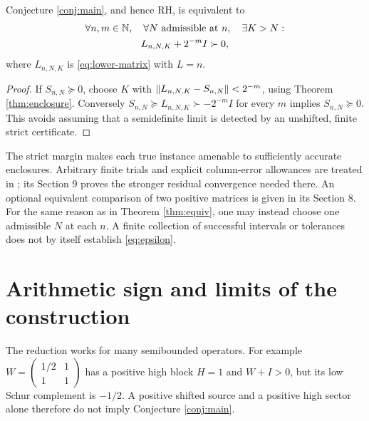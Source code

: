 \begin{corollary}\label{cor:epsilon}
Conjecture \ref{conj:main}, and hence RH, is equivalent to
\begin{equation}\label{eq:epsilon}
\begin{gathered}
\forall n,m\in\mathbb N,\quad\forall N\text{ admissible at }n,\quad\exists K>N:\\
L_{n,N,K}+2^{-m}I\succ0,
\end{gathered}
\end{equation}
where $L_{n,N,K}$ is \eqref{eq:lower-matrix} with $L=n$.
\end{corollary}
\begin{proof}
If $S_{n,N}\succeq0$, choose $K$ with
$\lVert L_{n,N,K}-S_{n,N}\rVert<2^{-m}$, using Theorem \ref{thm:enclosure}.
Conversely $S_{n,N}\succeq L_{n,N,K}\succ-2^{-m}I$ for every $m$ implies
$S_{n,N}\succeq0$. This avoids assuming that a semidefinite limit is detected
by an unshifted, finite strict certificate.
\end{proof}
The strict margin makes each true instance amenable to sufficiently
accurate enclosures. Arbitrary finite trials and explicit column-error
allowances are treated in \cite[Section 10]{Companion}; its Section 9 proves
the stronger residual convergence needed there. An optional equivalent
comparison of two positive matrices is given in its Section 8.
For the same reason as in Theorem \ref{thm:equiv}, one may instead choose
one admissible $N$ at each $n$. A finite collection of successful intervals
or tolerances does not by itself establish
\eqref{eq:epsilon}.

\section{Arithmetic sign and limits of the construction}
The reduction works for many semibounded operators. For example
$W=\left(\begin{smallmatrix}1/2&1\\1&1\end{smallmatrix}\right)$ has
a positive high block $H=1$ and $W+I>0$, but its low Schur complement is
$-1/2$. A positive shifted source and a positive high sector alone therefore
do not imply Conjecture \ref{conj:main}.

